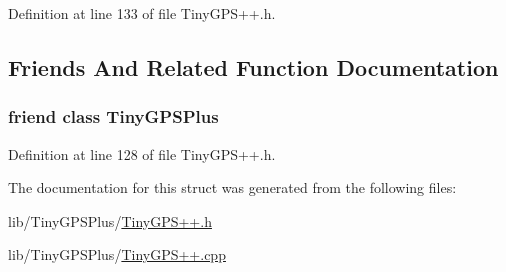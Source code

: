 Definition at line 133 of file Tiny\+G\+P\+S++.\+h.



\subsection{Friends And Related Function Documentation}
\subsubsection[{\texorpdfstring{Tiny\+G\+P\+S\+Plus}{TinyGPSPlus}}]{\setlength{\rightskip}{0pt plus 5cm}friend class {\bf Tiny\+G\+P\+S\+Plus}\hspace{0.3cm}{\ttfamily [friend]}}\hypertarget{struct_tiny_g_p_s_decimal_a6501fd5ef19ae166d43e0e5781609ee2}{}\label{struct_tiny_g_p_s_decimal_a6501fd5ef19ae166d43e0e5781609ee2}


Definition at line 128 of file Tiny\+G\+P\+S++.\+h.



The documentation for this struct was generated from the following files\+:\begin{DoxyCompactItemize}
\item 
lib/\+Tiny\+G\+P\+S\+Plus/\hyperlink{_tiny_g_p_s_09_09_8h}{Tiny\+G\+P\+S++.\+h}\item 
lib/\+Tiny\+G\+P\+S\+Plus/\hyperlink{_tiny_g_p_s_09_09_8cpp}{Tiny\+G\+P\+S++.\+cpp}\end{DoxyCompactItemize}
